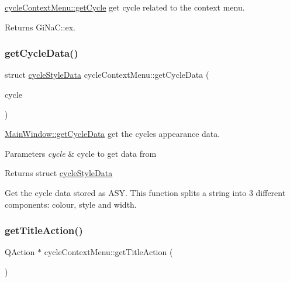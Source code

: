 \mbox{\hyperlink{classcycle_context_menu_a35b3868cdc32b97e7c4abc109ee13460}{cycle\+Context\+Menu\+::get\+Cycle}} get cycle related to the context menu. 

\begin{DoxyReturn}{Returns}
Gi\+Na\+C\+::ex. 
\end{DoxyReturn}
\mbox{\label{classcycle_context_menu_ae9e820ae7baf504c5229592a0901a12c}} 
\subsubsection{\texorpdfstring{get\+Cycle\+Data()}{getCycleData()}}
{\footnotesize\ttfamily struct \mbox{\hyperlink{structcycle_style_data}{cycle\+Style\+Data}} cycle\+Context\+Menu\+::get\+Cycle\+Data (\begin{DoxyParamCaption}\item[{const Gi\+Na\+C\+::ex \&}]{cycle }\end{DoxyParamCaption})}



\mbox{\hyperlink{class_main_window_a3088b7addf938e91e77b741a9ae22a53}{Main\+Window\+::get\+Cycle\+Data}} get the cycles appearance data. 


\begin{DoxyParams}{Parameters}
{\em cycle} & cycle to get data from \\
\hline
\end{DoxyParams}
\begin{DoxyReturn}{Returns}
struct \mbox{\hyperlink{structcycle_style_data}{cycle\+Style\+Data}}
\end{DoxyReturn}
Get the cycle data stored as A\+SY. This function splits a string into 3 different components\+: colour, style and width. \mbox{\label{classcycle_context_menu_a0e955d1a633d3585d11b7c193341a568}} 
\subsubsection{\texorpdfstring{get\+Title\+Action()}{getTitleAction()}}
{\footnotesize\ttfamily Q\+Action $\ast$ cycle\+Context\+Menu\+::get\+Title\+Action (\begin{DoxyParamCaption}{ }\end{DoxyParamCaption})}



